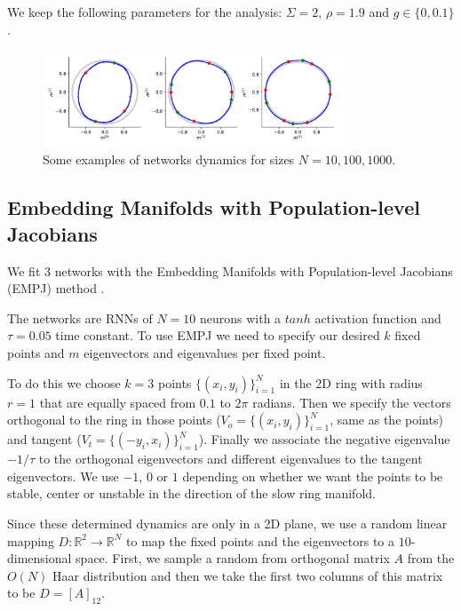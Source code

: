\documentclass{article} %
\newcounter{ct}
\newcommand{\reals}{\mathbb{R}}
\theoremstyle{definition}
\theoremstyle{remark}
\begin{document}
We keep the following parameters for the analysis:
\(\Sigma=2\),
\(\rho=1.9\) and
\(g\in\{0, 0.1\}\).


\begin{figure}[h]
\centering
\includegraphics[width=0.8\textwidth]{N100_si2_rho1.9_g0_fp4.8.12}
\caption{Some examples of networks dynamics for sizes \(N=10,100,1000\).}\label{fig:low_rank_examples}
\end{figure}



\subsection{Embedding Manifolds with Population-level Jacobians}\label{sec:supp:empj}
We fit 3 networks with the Embedding Manifolds with Population-level Jacobians (EMPJ) method \citep{pollock2020}.

The networks are RNNs of $N=10$ neurons with a $tanh$ activation function and $\tau = 0.05$ time constant.
 To use EMPJ we need to specify our desired $k$ fixed points and $m$ eigenvectors and eigenvalues per fixed point. 

To do this we choose $k=3$ points $\{(x_i, y_i)\}_{i=1}^N$ in the 2D ring with radius $r=1$ that are equally spaced from $0.1$ to $2 \pi$ radians. Then we specify the vectors orthogonal to the ring in those points ($V_o = \{(x_i, y_i)\}_{i=1}^N$, same as the points) and tangent ($V_t = \{(-y_i, x_i)\}_{i=1}^N$).
Finally we associate the negative eigenvalue $-1/\tau$ to the orthogonal eigenvectors and different eigenvalues to the tangent eigenvectors. We use $-1$, $0$ or $1$ depending on whether we want the points to be stable, center or unstable in the direction of the slow ring manifold. 

Since these determined dynamics are only in a 2D plane, we use a random linear mapping $D\colon\reals^2\rightarrow\reals^N$ to map the fixed points and the eigenvectors to a $10$-dimensional space. First, we sample a random from orthogonal matrix $A$ from the $O(N)$ Haar distribution and then we take the first two columns of this matrix to be $D=[A]_{12}$.
\end{document}
